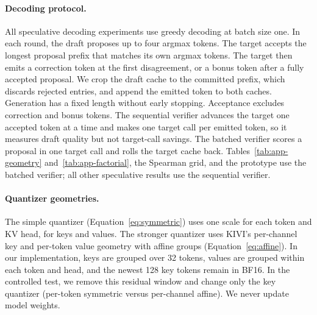 \documentclass{article}
\begin{document}
\paragraph{Decoding protocol.}
All speculative decoding experiments use greedy decoding at batch size one. In
each round, the draft proposes up to four argmax tokens. The target accepts the
longest proposal prefix that matches its own argmax tokens. The target
then emits a correction token at the first disagreement, or a bonus token after
a fully accepted proposal. We crop the draft cache to the committed prefix, which
discards rejected entries, and append the emitted token to both caches.
Generation has a fixed length without early stopping. Acceptance excludes
correction and bonus tokens. The sequential verifier advances the target one
accepted token at a time and makes one target call per emitted token, so it
measures draft quality but not target-call savings. The batched verifier scores
a proposal in one target call and rolls the target cache back. Tables~\ref{tab:app-geometry} and~\ref{tab:app-factorial}, the Spearman grid,
and the prototype use the batched verifier; all other speculative results use
the sequential verifier.

\paragraph{Quantizer geometries.}
The simple quantizer (Equation~\ref{eq:symmetric}) uses one scale for each
token and KV head, for keys and values. The stronger
quantizer uses KIVI's per-channel key and per-token value geometry
\citep{liu2024kivi} with affine groups (Equation~\ref{eq:affine}). In our implementation, keys are grouped over 32 tokens,
values are grouped within each token and head, and the newest 128 key tokens
remain in BF16. In the controlled test, we remove this residual window and
change only the key quantizer (per-token symmetric versus per-channel
affine). We never update model weights.
\end{document}
